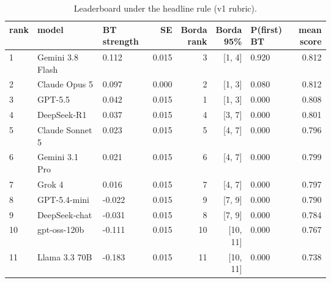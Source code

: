 \begin{table}[htbp]
\centering\tiny
\caption{Leaderboard under the headline rule (v1 rubric).}
\label{tab:leaderboard_headline}
\setlength{\tabcolsep}{3pt}
\begin{tabular}{lp{0.256\linewidth}p{0.176\linewidth}rrrp{0.176\linewidth}r}
\toprule
rank & model & BT strength & SE & Borda rank & Borda 95\% & P(first) BT & mean score \\
\midrule
1 & Gemini 3.8 Flash & 0.112 & 0.015 & 3 & [1, 4] & 0.920 & 0.812 \\
2 & Claude Opus 5 & 0.097 & 0.000 & 2 & [1, 3] & 0.080 & 0.812 \\
3 & GPT-5.5 & 0.042 & 0.015 & 1 & [1, 3] & 0.000 & 0.808 \\
4 & DeepSeek-R1 & 0.037 & 0.015 & 4 & [3, 7] & 0.000 & 0.801 \\
5 & Claude Sonnet 5 & 0.023 & 0.015 & 5 & [4, 7] & 0.000 & 0.796 \\
6 & Gemini 3.1 Pro & 0.021 & 0.015 & 6 & [4, 7] & 0.000 & 0.799 \\
7 & Grok 4 & 0.016 & 0.015 & 7 & [4, 7] & 0.000 & 0.797 \\
8 & GPT-5.4-mini & -0.022 & 0.015 & 9 & [7, 9] & 0.000 & 0.790 \\
9 & DeepSeek-chat & -0.031 & 0.015 & 8 & [7, 9] & 0.000 & 0.784 \\
10 & gpt-oss-120b & -0.111 & 0.015 & 10 & [10, 11] & 0.000 & 0.767 \\
11 & Llama 3.3 70B & -0.183 & 0.015 & 11 & [10, 11] & 0.000 & 0.738 \\
\bottomrule
\end{tabular}
\end{table}
